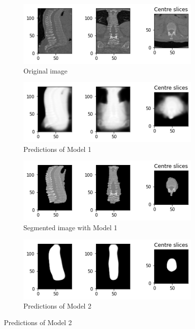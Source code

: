 \begin{figure}[ht!]
\centering
\begin{subfigure}[b]{0.70\textwidth}
   \includegraphics[width=1\linewidth]{images/results_1/original.png}
   \caption{Original image}
   \label{fig:Ng1} 
\end{subfigure}

\begin{subfigure}[b]{0.70\textwidth}
   \includegraphics[width=1\linewidth]{images/results_1/binary_mask.png}
   \caption{Predictions of Model 1}
   \label{fig:Ng2}
\end{subfigure}

\begin{subfigure}[b]{0.70\textwidth}
   \includegraphics[width=1\linewidth]{images/results_1/binary_segmented.png}
   \caption{Segmented image with Model 1}
   \label{fig:Ng3}
\end{subfigure}

\begin{subfigure}[b]{0.70\textwidth}
   \includegraphics[width=1\linewidth]{images/results_1/dice_mask.png}
   \caption{Predictions of Model 2}
   \label{fig:Ng4}
\end{subfigure}


\end{figure}
